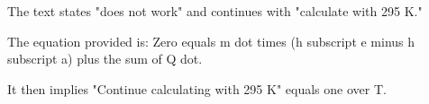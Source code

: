 The text states "does not work" and continues with "calculate with 295 K."

The equation provided is:
Zero equals m dot times (h subscript e minus h subscript a) plus the sum of Q dot.

It then implies "Continue calculating with 295 K" equals one over T.
